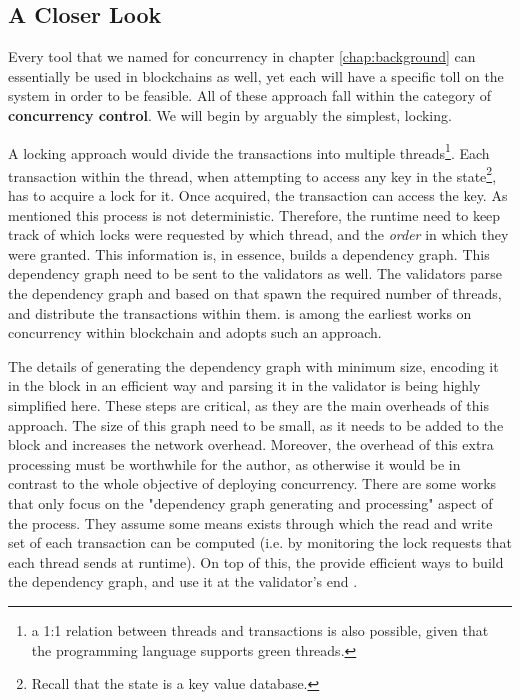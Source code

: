 \subsection{A Closer Look}

Every tool that we named for concurrency in chapter \ref{chap:background} can essentially be used in
blockchains as well, yet each will have a specific toll on the system in order to be feasible. All
of these approach fall within the category of \textbf{concurrency control}. We will begin by
arguably the simplest, locking.

A locking approach would divide the transactions into multiple threads\footnote{a 1:1 relation
between threads and transactions is also possible, given that the programming language supports
green threads.}. Each transaction within the thread, when attempting to access any key in the
state\footnote{Recall that the state is a key value database.}, has to acquire a lock for it. Once
acquired, the transaction can access the key. As mentioned this process is not deterministic.
Therefore, the runtime need to keep track of which locks were requested by which thread, and the
\textit{order} in which they were granted. This information is, in essence, builds a dependency
graph. This dependency graph need to be sent to the validators as well. The validators parse the
dependency graph and based on that spawn the required number of threads, and distribute the
transactions within them. \cite{dickersonSmartLocksAddingConcurrency2017} is among the earliest
works on concurrency within blockchain and adopts such an approach.

The details of generating the dependency graph with minimum size, encoding it in the block in an
efficient way and parsing it in the validator is being highly simplified here. These steps are
critical, as they are the main overheads of this approach. The size of this graph need to be small,
as it needs to be added to the block and increases the network overhead. Moreover, the overhead of
this extra processing must be worthwhile for the author, as otherwise it would be in contrast to the
whole objective of deploying concurrency. There are some works that only focus on the "dependency
graph generating and processing" aspect of the process. They assume some means exists through which
the read and write set of each transaction can be computed (i.e. by monitoring the lock requests
that each thread sends at runtime). On top of this, the provide efficient ways to build the
dependency graph, and use it at the validator's end \cite{EnablingConcurrencySmart2018}.

